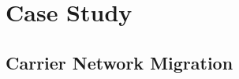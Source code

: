 
\chapter{Case Study} \label{ch:case_studies}

\section{Carrier Network Migration}\label{sec:case_studies:att}



